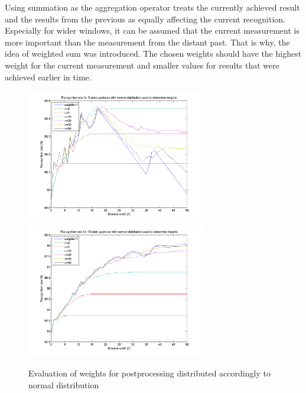 Using summation as the aggregation operator treats the currently achieved result and the results from the previous as equally affecting the current recognition. 
Especially for wider windows, it can be assumed that the current measurement is more important than the measurement from the distant past.
That is why, the idea of weighted sum was introduced.
The chosen weights should have the highest weight for the current measurement and smaller values for results that were achieved earlier in time.

\begin{figure}[htbp!]
\centering
 \includegraphics[width=0.7\textwidth]{figures/gaussSum5.png}
\centering
 \includegraphics[width=0.7\textwidth]{figures/gaussSum10.png}
 
 \caption{Evaluation of weights for postprocessing distributed accordingly to normal distribution}
 \label{staticgauss}
\end{figure}

